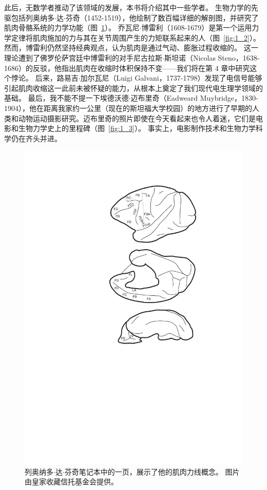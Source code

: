 此后，无数学者推动了该领域的发展，本书将介绍其中一些学者。
生物力学的先驱包括列奥纳多$\cdot$达$\cdot$芬奇（1452-1519），他绘制了数百幅详细的解剖图，并研究了肌肉骨骼系统的力学功能（图~\ref{fig:1_1}）。
乔瓦尼$\cdot$博雷利（1608-1679）是第一个运用力学定律将肌肉施加的力与其在关节周围产生的力矩联系起来的人（图~\ref{fig:1_2}）。
然而，博雷利仍然坚持经典观点，认为肌肉是通过气动、膨胀过程收缩的。
这一理论遭到了佛罗伦萨宫廷中博雷利的对手尼古拉斯$\cdot$斯坦诺（Nicolas Steno，1638-1686）的反驳，他指出肌肉在收缩时体积保持不变——我们将在第 4 章中研究这个悖论。
后来，路易吉$\cdot$加尔瓦尼（Luigi Galvani，1737-1798）发现了电信号能够引起肌肉收缩这一此前未被怀疑的能力，从根本上奠定了我们现代电生理学领域的基础。
最后，我不能不提一下埃德沃德$\cdot$迈布里奇（Eadweard Muybridge，1830-1904），他在距离我家约一公里（现在的斯坦福大学校园）的地方进行了早期的人类和动物运动摄影研究。迈布里奇的照片即使在今天看起来也令人着迷，它们是电影和生物力学史上的里程碑（图~\ref{fig:1_3}）。
事实上，电影制作技术和生物力学科学仍在齐头并进。


\begin{figure}[!htb]
	\centering
	\includegraphics[width=0.75\linewidth]{chap1/1_1}
	\caption{列奥纳多$\cdot$达$\cdot$芬奇笔记本中的一页，展示了他的肌肉力线概念。
		图片由皇家收藏信托基金会提供。 \label{fig:1_1}}
\end{figure}


